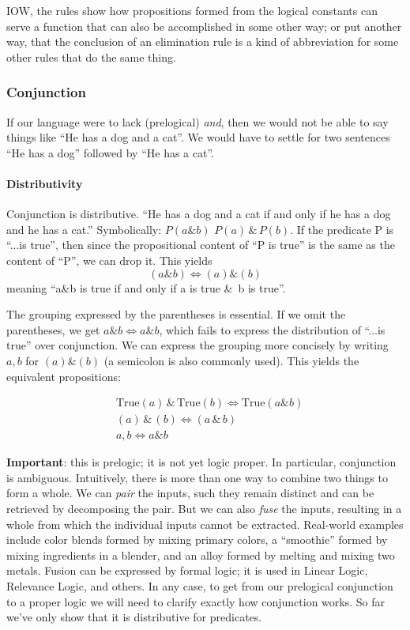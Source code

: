 \documentclass{article}
\begin{document}
IOW, the rules show how propositions formed from the logical constants
can serve a function that can also be accomplished in some other way;
or put another way, that the conclusion of an elimination rule is a
kind of abbreviation for some other rules that do the same thing.

\subsubsection{Conjunction}

If our language were to lack (prelogical) \textit{and}, then we would
not be able to say things like ``He has a dog and a cat''. We would
have to settle for two sentences ``He has a dog'' followed by ``He
has a cat''.

\paragraph{Distributivity
\newline}

Conjunction is distributive. ``He has a dog and a cat if and only if
he has a dog and he has a cat.'' Symbolically: \(P(a\&b)\)\iff
\(P(a)\,\&\,P(b)\). If the predicate P is ``...is true'', then since the
propositional content of ``P is true'' is the same as the content of
``P'', we can drop it. This yields \[(a\&b)\iff (a)\&(b)\] meaning
``a\&b is true if and only if a is true \&\, b is true''.

The grouping expressed by the parentheses is essential. If we omit the
parentheses, we get \(a\& b\iff a\&b\), which fails to express the
distribution of ``...is true'' over conjunction. We can express the
grouping more concisely by writing \(a,b\) for \((a)\&(b)\) (a
semicolon is also commonly used). This yields the equivalent
propositions:

\begin{align}
  & \text{True}(a)\,\&\,\text{True}(b)\iff \text{True}(a\&b) \\
  & (a)\,\&\,(b)\iff (a\,\&\,b) \\
  & a,b\iff a\&b
\end{align}

\textbf{Important}: this is prelogic; it is not yet logic proper. In
particular, conjunction is ambiguous. Intuitively, there is more than
one way to combine two things to form a whole. We can \textit{pair}
the inputs, such they remain distinct and can be retrieved by
decomposing the pair. But we can also \textit{fuse} the inputs,
resulting in a whole from which the individual inputs cannot be
extracted. Real-world examples include color blends formed by mixing
primary colors, a ``smoothie'' formed by mixing ingredients in a
blender, and an alloy formed by melting and mixing two metals. Fusion
can be expressed by formal logic; it is used in Linear Logic,
Relevance Logic, and others. In any case, to get from our prelogical
conjunction to a proper logic we will need to clarify exactly how
conjunction works. So far we've only show that it is distributive for
predicates.
\end{document}
